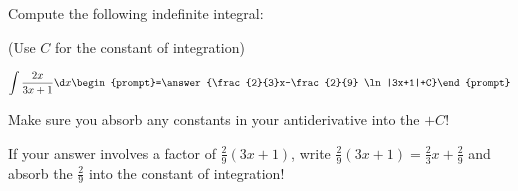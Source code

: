 \documentclass{ximera}
\author{Jim Talamo}
\begin{document}
\begin{exercise}

Compute the following indefinite integral:

\begin{prompt} (Use $C$ for the constant of integration) \end{prompt}

\[
\int \frac{2x}{3x+1} \d x 
\begin{prompt}=\answer{\frac{2}{3}x-\frac{2}{9} \ln|3x+1|+C}\end{prompt}
\]

Make sure you absorb any constants in your antiderivative into the $+C$!

\begin{hint}
If your answer involves a factor of $\frac{2}{9}(3x+1)$, write $\frac{2}{9}(3x+1) = \frac{2}{3}x+\frac{2}{9}$ and absorb the $\frac{2}{9}$ into the constant of integration!
\end{hint}

\end{exercise}
\end{document}
